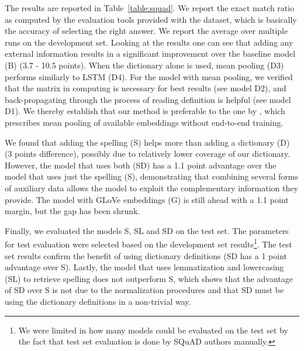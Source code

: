 The results are reported in Table~\ref{table:squad}. We report the exact match ratio as computed by the evaluation tools provided with the dataset, which is basically the accuracy of selecting the right answer. We report 
the average over multiple runs on the development set.  Looking at the results one can see that adding any external information results in a significant improvement over the baseline model (B) (3.7 - 10.5 points). When the dictionary alone is used, mean pooling (D3) performs similarly to LSTM (D4).
For the model with mean pooling, we verified that the matrix  in computing  is necessary for best results (see model D2), and back-propagating through the process of reading definition is helpful (see model D1). We thereby establish that our method is preferable to the one by \citet{long2016leveraging}, which prescribes mean pooling of available embeddings without end-to-end training.



We found that adding the spelling (S) helps more than adding a dictionary (D) (3 points difference), possibly due to relatively lower coverage 
of our dictionary. However,  the model that uses both (SD) has a 1.1 point
advantage over the model that uses just the spelling (S), demonstrating that combining several forms of auxiliary data allows the model to exploit the complementary information they provide. The model with GLoVe embeddings (G) is still ahead with a 1.1 point margin, but the gap has been shrunk. 

Finally, we evaluated the models S, SL and SD on the test set. The parameters for test evaluation were selected based on the development set results\footnote{We were limited in how many models could be evaluated on the test set by the fact that test set evaluation is done by SQuAD authors manually.}. The test set results confirm the benefit of using dictionary definitions (SD has a 1 point advantage over S).  Lastly, the model that uses lemmatization and lowercasing (SL) to retrieve spelling does not outperform S, which shows that the advantage of SD over S is not due to the normalization procedures and that SD must be using the dictionary definitions in a non-trivial way.

